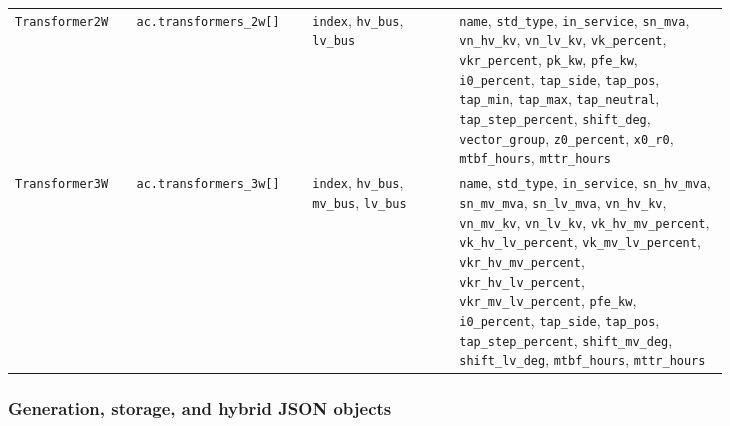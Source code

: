\begin{longtable}{L{0.14\linewidth}L{0.18\linewidth}L{0.18\linewidth}L{0.33\linewidth}}
\texttt{Transformer2W} & \texttt{ac.transformers\_2w[]} & \texttt{index}, \texttt{hv\_bus}, \texttt{lv\_bus} & \texttt{name}, \texttt{std\_type}, \texttt{in\_service}, \texttt{sn\_mva}, \texttt{vn\_hv\_kv}, \texttt{vn\_lv\_kv}, \texttt{vk\_percent}, \texttt{vkr\_percent}, \texttt{pk\_kw}, \texttt{pfe\_kw}, \texttt{i0\_percent}, \texttt{tap\_side}, \texttt{tap\_pos}, \texttt{tap\_min}, \texttt{tap\_max}, \texttt{tap\_neutral}, \texttt{tap\_step\_percent}, \texttt{shift\_deg}, \texttt{vector\_group}, \texttt{z0\_percent}, \texttt{x0\_r0}, \texttt{mtbf\_hours}, \texttt{mttr\_hours} \\
\texttt{Transformer3W} & \texttt{ac.transformers\_3w[]} & \texttt{index}, \texttt{hv\_bus}, \texttt{mv\_bus}, \texttt{lv\_bus} & \texttt{name}, \texttt{std\_type}, \texttt{in\_service}, \texttt{sn\_hv\_mva}, \texttt{sn\_mv\_mva}, \texttt{sn\_lv\_mva}, \texttt{vn\_hv\_kv}, \texttt{vn\_mv\_kv}, \texttt{vn\_lv\_kv}, \texttt{vk\_hv\_mv\_percent}, \texttt{vk\_hv\_lv\_percent}, \texttt{vk\_mv\_lv\_percent}, \texttt{vkr\_hv\_mv\_percent}, \texttt{vkr\_hv\_lv\_percent}, \texttt{vkr\_mv\_lv\_percent}, \texttt{pfe\_kw}, \texttt{i0\_percent}, \texttt{tap\_side}, \texttt{tap\_pos}, \texttt{tap\_step\_percent}, \texttt{shift\_mv\_deg}, \texttt{shift\_lv\_deg}, \texttt{mtbf\_hours}, \texttt{mttr\_hours} \\
\bottomrule
\end{longtable}
\normalsize

\subsubsection*{Generation, storage, and hybrid JSON objects}

